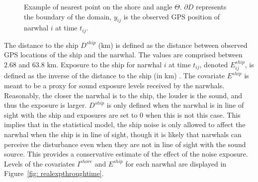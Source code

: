 \documentclass[aoas]{imsart}
\theoremstyle{definition}
\theoremstyle{remark}
\theoremstyle{remark}
\newcommand {\1}{\mathbb{1}}
\begin{document}
\begin{figure}[ht!]
	\centering
	\caption{Example of nearest point on the shore and angle $\Theta$. $\partial D$ represents the boundary of the domain, $y_{ij}$ is the observed GPS position of narwhal $i$ at time $t_{ij}$.}
	\label{fig: illustration nearest shore points}
\end{figure}

The distance to the ship $D^{ship}$ (km) is defined as the distance between observed GPS locations of the ship and the narwhal. The values are comprised between $2.68$ and $63.8$ km.
Exposure to the ship for narwhal $i$ at time $t_{ij}$, denoted $E^{ship}_{ij}$, is defined as the inverse of the distance to the ship (in km) \citep{heide-jorgensen_behavioral_2021}. The covariate $E^{ship}$ is meant to be a proxy for sound exposure levels received by the narwhals. Reasonably, the closer the narwhal is to the ship, the louder is the sound, and thus the exposure is larger. 
$D^{ship}$ is only defined when the narwhal is in line of sight with the ship and exposures are set to $0$ when this is not this case. This implies that in the statistical model, the ship noise is only allowed to affect the narwhal when the ship is in line of sight, though it is likely that narwhals can perceive the disturbance even when they are not in line of sight with the sound source. This provides a conservative estimate of the effect of the noise exposure. Levels of the covariates $I^{shore}$ and $E^{ship}$ for each narwhal are displayed in Figure~\ref{fig: realexpthroughtime}.
\end{document}
